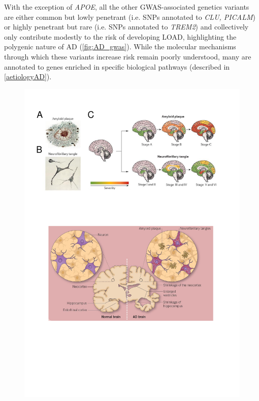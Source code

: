 With the exception of \textit{APOE}, all the other GWAS-associated genetics variants are either common but lowly penetrant (i.e. SNPs annotated to \textit{CLU, PICALM}) or highly penetrant but rare (i.e. SNPs annotated to \textit{TREM2}) and collectively only contribute modestly to the risk of developing LOAD, highlighting the polygenic nature of AD (\cref{fig:AD_gwas}). While the molecular mechanisms through which these variants increase risk remain poorly understood, many are annotated to genes enriched in specific biological pathways (described in \cref{aetiologyAD}). 


\begin{landscape}
	\begin{figure}[!htp]
		\centering
		\includegraphics[page=11,trim={0 17cm 0cm 1cm},clip, scale = 1.2]{Figures/Introduction_Figures.pdf}
		\captionsetup{width=1.6\textwidth,singlelinecheck=off}

\end{figure}
\end{landscape}
